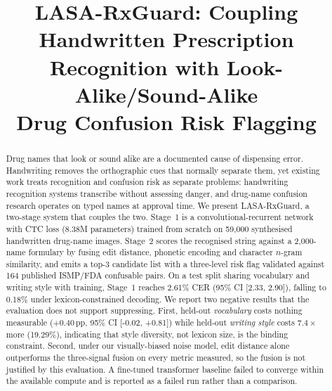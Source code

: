 \documentclass[conference]{IEEEtran}
\begin{document}
\title{LASA-RxGuard: Coupling Handwritten Prescription\\Recognition with Look-Alike/Sound-Alike\\Drug Confusion Risk Flagging}

\author{
\and
{}
}

\maketitle

\begin{abstract}
Drug names that look or sound alike are a documented cause of dispensing error.
Handwriting removes the orthographic cues that normally separate them, yet
existing work treats recognition and confusion risk as separate problems:
handwriting recognition systems transcribe without assessing danger, and
drug-name confusion research operates on typed names at approval time. We
present LASA-RxGuard, a two-stage system that couples the two. Stage~1 is a
convolutional-recurrent network with CTC loss (8.38M parameters) trained from
scratch on 59{,}000 synthesised handwritten drug-name images. Stage~2 scores the
recognised string against a 2{,}000-name formulary by fusing edit distance,
phonetic encoding and character $n$-gram similarity, and emits a top-3 candidate
list with a three-level risk flag validated against 164 published ISMP/FDA
confusable pairs. On a test split sharing vocabulary and writing style with
training, Stage~1 reaches 2.61\% CER (95\% CI [2.33, 2.90]), falling to 0.18\%
under lexicon-constrained decoding. We report two negative results that the
evaluation does not support suppressing. First, held-out \emph{vocabulary} costs
nothing measurable (+0.40\,pp, 95\% CI [-0.02, +0.81]) while held-out \emph{writing style} costs
$7.4\times$ more (19.29\%), indicating that style diversity, not lexicon size,
is the binding constraint. Second, under our visually-biased noise model,
edit distance alone outperforms the three-signal fusion on every metric
measured, so the fusion is not justified by this evaluation. A fine-tuned
transformer baseline failed to converge within the available compute and is
reported as a failed run rather than a comparison.
\end{abstract}
\end{document}
